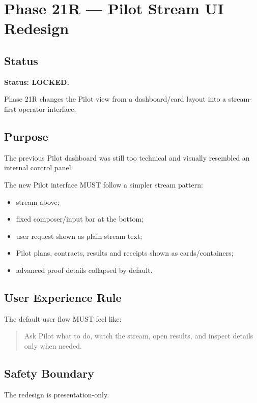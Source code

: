 \section{Phase 21R --- Pilot Stream UI Redesign}
\label{sec:aion-phase21r-pilot-stream-ui-redesign}

\subsection{Status}

\textbf{Status: LOCKED.}

Phase 21R changes the Pilot view from a dashboard/card layout into a stream-first operator interface.

\subsection{Purpose}

The previous Pilot dashboard was still too technical and visually resembled an internal control panel.

The new Pilot interface MUST follow a simpler stream pattern:

\begin{itemize}
  \item stream above;
  \item fixed composer/input bar at the bottom;
  \item user request shown as plain stream text;
  \item Pilot plans, contracts, results and receipts shown as cards/containers;
  \item advanced proof details collapsed by default.
\end{itemize}

\subsection{User Experience Rule}

The default user flow MUST feel like:

\begin{quote}
Ask Pilot what to do, watch the stream, open results, and inspect details only when needed.
\end{quote}

\subsection{Safety Boundary}

The redesign is presentation-only.

